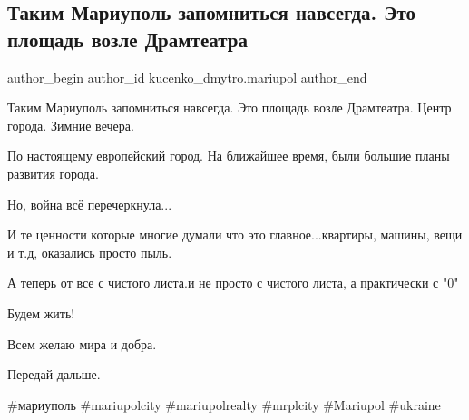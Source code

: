  
 
 
 
 

\subsection{Таким Мариуполь запомниться навсегда. Это площадь возле Драмтеатра}
\label{sec:10_06_2022.fb.kucenko_dmytro.mariupol.1.takim_mariupol_zapom}

\ifcmt
 author_begin
   author_id kucenko_dmytro.mariupol
 author_end
\fi

Таким Мариуполь запомниться навсегда. Это площадь возле Драмтеатра. Центр
города. Зимние вечера.

По настоящему европейский город. На ближайшее время, были большие планы
развития города. 

Но, война всё перечеркнула...

И те ценности которые многие думали что это главное...квартиры, машины, вещи и
т.д, оказались просто пыль.

А теперь от все с чистого листа.и не просто с чистого листа, а практически с
"0"

Будем жить!

Всем желаю мира и добра.

Передай дальше.

\#мариуполь \#mariupolcity \#mariupolrealty \#mrplcity \#Mariupol \#ukraine
